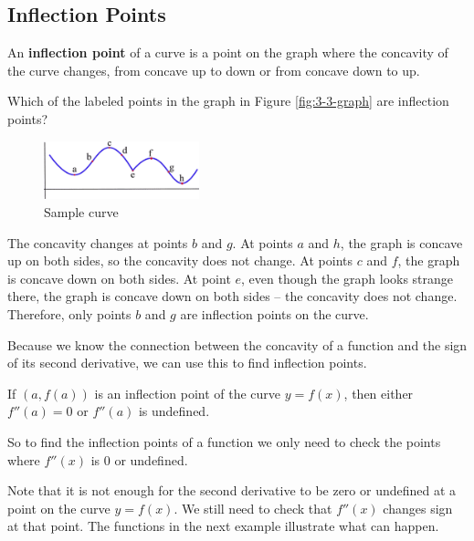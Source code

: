 \subsection{Inflection Points}

\begin{definition}
An {\bf inflection point} of a curve is a point on the graph where the concavity of the curve changes, from concave up to down or from concave down to up.
\end{definition}

\begin{example}
Which of the labeled points in the graph in Figure \ref{fig:3-3-graph} are inflection points?

\begin{figure}[!ht]
  \centering
    \includegraphics[width=0.4\textwidth]{img/chap3/image047.png}
    \caption{Sample curve}
    \label{fig:3-3-curve}
\end{figure}
\begin{solution} The concavity changes at points $b$ and $g$. At points $a$ and $h$, the graph is concave up on both sides, so the concavity does not change. At points $c$ and $f$, the graph is concave down on both sides. At point $e$, even though the graph looks strange there, the graph is concave down on both sides – the concavity does not change. Therefore, only points $b$ and $g$ are inflection points on the curve.
\end{solution}\end{example}

Because we know the connection between the concavity of a function and the sign of its second derivative, we can use this to find inflection points.

\begin{theorem}
If $(a, f(a))$ is an inflection point of the curve $y=f(x)$, then either $f''(a) = 0$ or $f''(a)$ is undefined. 
\end{theorem}
So to find the inflection points of a function we only need to check the points where $f''(x)$ is 0 or undefined.

Note that it is not enough for the second derivative to be zero or undefined at a point on the curve $y=f(x)$. We still need to check that $f''(x)$ changes sign at that point. The functions in the next example illustrate what can happen.

